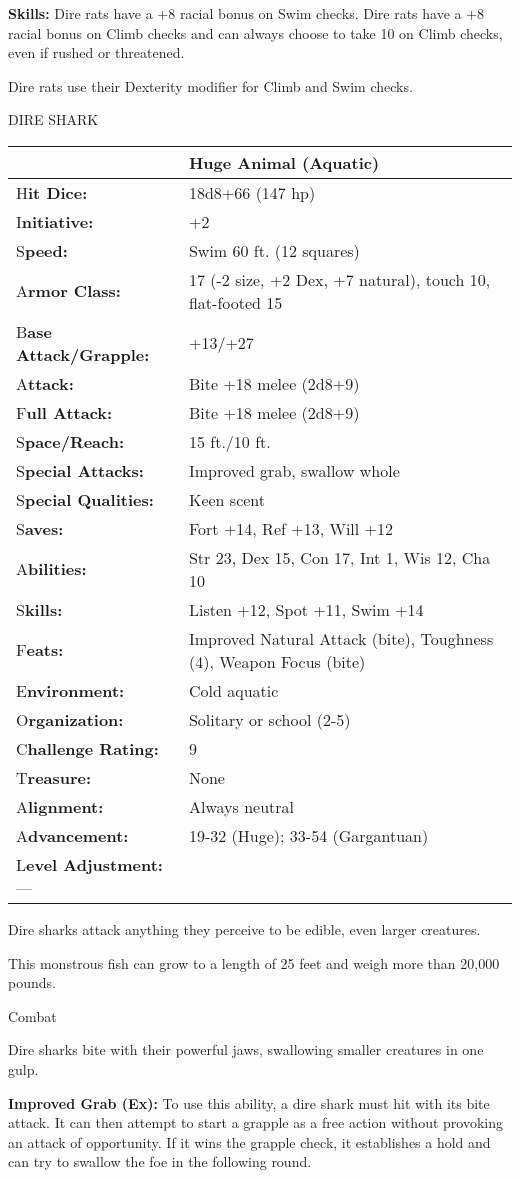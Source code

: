 \documentclass{article}
\begin{document}
\textbf{Skills:} Dire rats have a +8 racial bonus on Swim checks. Dire rats have 
a +8 racial bonus on Climb checks and can always choose to take 10 on Climb checks, 
even if rushed or threatened.

Dire rats use their Dexterity modifier for Climb and Swim checks.

\vspace{12pt}
DIRE SHARK

\begin{tabular}{|>{\raggedright}p{91pt}|>{\raggedright}p{231pt}|}
\hline
  & Huge Animal (Aquatic)\tabularnewline
\hline
H\textbf{it Dice:} & 18d8+66 (147 hp)\tabularnewline
\hline
I\textbf{nitiative:} & +2\tabularnewline
\hline
S\textbf{peed:} & Swim 60 ft. (12 squares)\tabularnewline
\hline
A\textbf{rmor Class:} & 17 (-2 size, +2 Dex, +7 natural), touch 10, flat-footed 
15\tabularnewline
\hline
B\textbf{ase Attack/Grapple:} & +13/+27\tabularnewline
\hline
A\textbf{ttack:} & Bite +18 melee (2d8+9)\tabularnewline
\hline
F\textbf{ull Attack:} & Bite +18 melee (2d8+9)\tabularnewline
\hline
S\textbf{pace/Reach:} & 15 ft./10 ft.\tabularnewline
\hline
S\textbf{pecial Attacks:} & Improved grab, swallow whole\tabularnewline
\hline
S\textbf{pecial Qualities:} & Keen scent\tabularnewline
\hline
S\textbf{aves:} & Fort +14, Ref +13, Will +12\tabularnewline
\hline
A\textbf{bilities:} & Str 23, Dex 15, Con 17, Int 1, Wis 12, Cha 10\tabularnewline
\hline
S\textbf{kills:} & Listen +12, Spot +11, Swim +14\tabularnewline
\hline
F\textbf{eats:} & Improved Natural Attack (bite), Toughness (4), Weapon Focus (bite)\tabularnewline
\hline
E\textbf{nvironment:} & Cold aquatic\tabularnewline
\hline
O\textbf{rganization:} & Solitary or school (2-5)\tabularnewline
\hline
C\textbf{hallenge Rating:} & 9\tabularnewline
\hline
T\textbf{reasure:} & None\tabularnewline
\hline
A\textbf{lignment:} & Always neutral\tabularnewline
\hline
A\textbf{dvancement:} & 19-32 (Huge); 33-54 (Gargantuan)\tabularnewline
\hline
L\textbf{evel Adjustment:}--- & \tabularnewline
\hline
\end{tabular}

Dire sharks attack anything they perceive to be edible, even larger creatures. 

This monstrous fish can grow to a length of 25 feet and weigh more than 20,000 
pounds.

Combat

Dire sharks bite with their powerful jaws, swallowing smaller creatures in one 
gulp.

\textbf{Improved Grab (Ex):} To use this ability, a dire shark must hit with its 
bite attack. It can then attempt to start a grapple as a free action without provoking 
an attack of opportunity. If it wins the grapple check, it establishes a hold and 
can try to swallow the foe in the following round.
\end{document}
